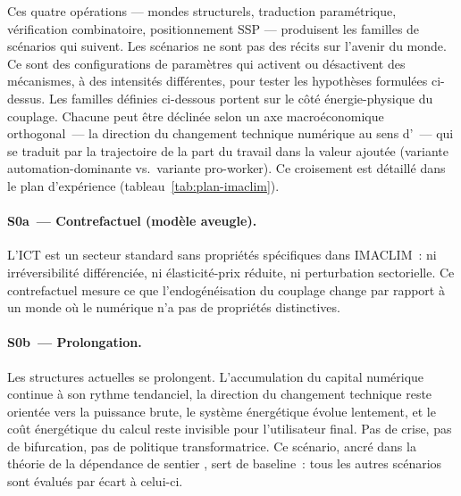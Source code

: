 Ces quatre opérations --- mondes structurels, traduction paramétrique, vérification combinatoire, positionnement SSP --- produisent les familles de scénarios qui suivent. Les scénarios ne sont pas des récits sur l'avenir du monde. Ce sont des configurations de paramètres qui activent ou désactivent des mécanismes, à des intensités différentes, pour tester les hypothèses formulées ci-dessus. Les familles définies ci-dessous portent sur le côté énergie-physique du couplage. Chacune peut être déclinée selon un axe macroéconomique orthogonal~--- la direction du changement technique numérique au sens d'\textcite{acemoglu_building_2026}~--- qui se traduit par la trajectoire de la part du travail dans la valeur ajoutée (variante \og automation-dominante\fg{} vs.\ variante \og pro-worker\fg{}). Ce croisement est détaillé dans le plan d'expérience (tableau~\ref{tab:plan-imaclim}).

\paragraph{S0a~--- Contrefactuel (mod\`ele aveugle).}
L'ICT est un secteur standard sans propri\'et\'es sp\'ecifiques dans IMACLIM~: ni irr\'eversibilit\'e diff\'erenci\'ee, ni \'elasticit\'e-prix r\'eduite, ni perturbation sectorielle. Ce contrefactuel mesure ce que l'endog\'en\'eisation du couplage change par rapport \`a un monde o\`u le num\'erique n'a pas de propri\'et\'es distinctives.

\paragraph{S0b~--- Prolongation.}
Les structures actuelles se prolongent. L'accumulation du capital num\'erique continue \`a son rythme tendanciel, la direction du changement technique reste orient\'ee vers la puissance brute, le syst\`eme \'energ\'etique \'evolue lentement, et le co\^ut \'energ\'etique du calcul reste invisible pour l'utilisateur final. Pas de crise, pas de bifurcation, pas de politique transformatrice. Ce sc\'enario, ancr\'e dans la th\'eorie de la d\'ependance de sentier \parencite{arthur_competing_1989, david_clio_1985}, sert de baseline~: tous les autres sc\'enarios sont \'evalu\'es par \'ecart \`a celui-ci.


